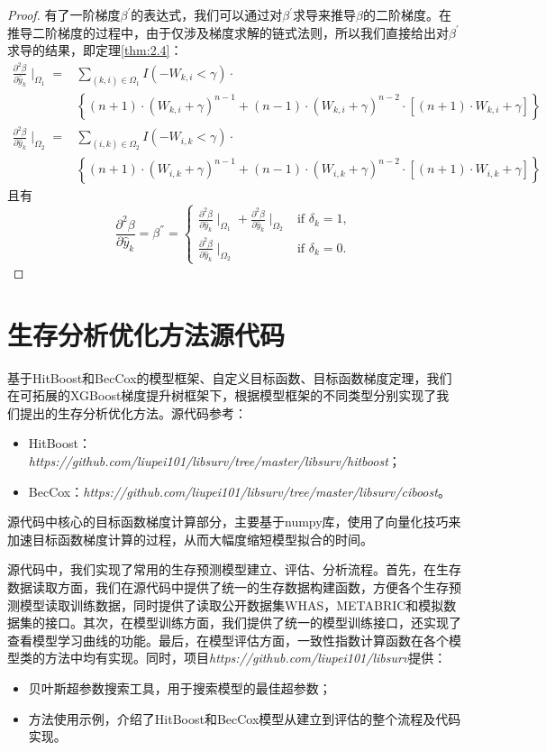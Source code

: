 \begin{proof}
有了一阶梯度$\beta^{'}$的表达式，我们可以通过对$\beta^{'}$求导来推导$\beta$的二阶梯度。在推导二阶梯度的过程中，由于仅涉及梯度求解的链式法则，所以我们直接给出对$\beta^{'}$求导的结果，即定理\ref{thm:2.4}：\[
\begin{split}
\frac{\partial^2 \beta}{\partial \hat{y}_k} \mid_{\Omega_1} =& \sum\limits_{(k,i)\in \Omega_1} I(-W_{k,i}<\gamma)\cdot \\
  & \left\{(n+1)\cdot (W_{k,i}+\gamma)^{n-1} + (n-1)\cdot (W_{k,i}+\gamma)^{n-2}\cdot [(n+1)\cdot W_{k,i}+\gamma]\right\} \\
\frac{\partial^2 \beta}{\partial \hat{y}_k} \mid_{\Omega_2} =& \sum\limits_{(i,k)\in \Omega_2} I(-W_{i,k}<\gamma)\cdot \\
  & \left\{(n+1)\cdot (W_{i,k}+\gamma)^{n-1} + (n-1)\cdot (W_{i,k}+\gamma)^{n-2}\cdot [(n+1)\cdot W_{i,k}+\gamma]\right\}
\end{split}
\] 且有$$
\frac{\partial^2 \beta}{\partial \hat{y}_k}=\beta^{''}=
\begin{cases}
\frac{\partial^2 \beta}{\partial \hat{y}_k} \mid_{\Omega_1} + \frac{\partial^2 \beta}{\partial \hat{y}_k} \mid_{\Omega_2} & \text{if } \delta_k = 1,\\
\frac{\partial^2 \beta}{\partial \hat{y}_k} \mid_{\Omega_2} & \text{if } \delta_k = 0.
\end{cases}
$$
\end{proof}

\chapter{生存分析优化方法源代码}

基于HitBoost和BecCox的模型框架、自定义目标函数、目标函数梯度定理，我们在可拓展的XGBoost梯度提升树框架下，根据模型框架的不同类型分别实现了我们提出的生存分析优化方法。源代码参考：
\begin{itemize}
  \item HitBoost：\emph{https://github.com/liupei101/libsurv/tree/master/libsurv/hitboost}；
  \item BecCox：\emph{https://github.com/liupei101/libsurv/tree/master/libsurv/ciboost}。
\end{itemize}
源代码中核心的目标函数梯度计算部分，主要基于numpy库，使用了向量化技巧来加速目标函数梯度计算的过程，从而大幅度缩短模型拟合的时间。

源代码中，我们实现了常用的生存预测模型建立、评估、分析流程。首先，在生存数据读取方面，我们在源代码中提供了统一的生存数据构建函数，方便各个生存预测模型读取训练数据，同时提供了读取公开数据集WHAS，METABRIC和模拟数据集的接口。其次，在模型训练方面，我们提供了统一的模型训练接口，还实现了查看模型学习曲线的功能。最后，在模型评估方面，一致性指数计算函数在各个模型类的方法中均有实现。同时，项目\emph{https://github.com/liupei101/libsurv}提供：
\begin{itemize}
  \item 贝叶斯超参数搜索工具，用于搜索模型的最佳超参数；
  \item 方法使用示例，介绍了HitBoost和BecCox模型从建立到评估的整个流程及代码实现。
\end{itemize}